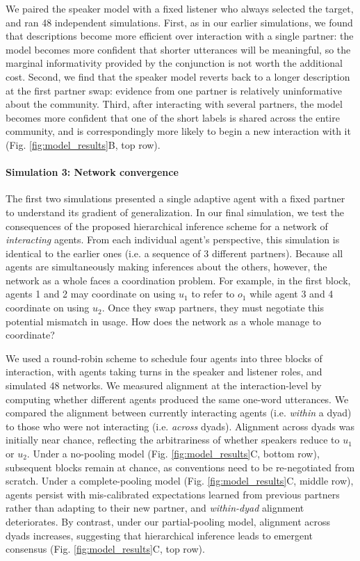 We paired the speaker model with a fixed listener who always selected the target, and ran 48 independent simulations.
First, as in our earlier simulations, we found that descriptions become more efficient over interaction with a single partner: the model becomes more confident that shorter utterances will be meaningful, so the marginal informativity provided by the conjunction is not worth the additional cost.
Second, we find that the speaker model reverts back to a longer description at the first partner swap: evidence from one partner is relatively uninformative about the community.
Third, after interacting with several partners, the model becomes more confident that one of the short labels is shared across the entire community, and is correspondingly more likely to begin a new interaction with it (Fig. \ref{fig:model_results}B, top row).

\paragraph{Simulation 3: Network convergence}

The first two simulations presented a single adaptive agent with a fixed partner to understand its gradient of generalization. 
In our final simulation, we test the consequences of the proposed hierarchical inference scheme for a network of \emph{interacting} agents.
From each individual agent's perspective, this simulation is identical to the earlier ones (i.e. a sequence of 3 different partners).
Because all agents are simultaneously making inferences about the others, however, the network as a whole faces a coordination problem.
For example, in the first block, agents 1 and 2 may coordinate on using $u_1$ to refer to $o_1$ while agent 3 and 4 coordinate on using $u_2$. 
Once they swap partners, they must negotiate this potential mismatch in usage. 
How does the network as a whole manage to coordinate?

We used a round-robin scheme to schedule four agents into three blocks of interaction, with agents taking turns in the speaker and listener roles, and simulated 48 networks.
We measured alignment at the interaction-level by computing whether different agents produced the same one-word utterances. 
We compared the alignment between currently interacting agents (i.e. \emph{within} a dyad) to those who were not interacting (i.e. \emph{across} dyads).
Alignment across dyads was initially near chance, reflecting the arbitrariness of whether speakers reduce to $u_1$ or $u_2$. 
Under a no-pooling model (Fig. \ref{fig:model_results}C, bottom row), subsequent blocks remain at chance, as conventions need to be re-negotiated from scratch.
Under a complete-pooling model (Fig. \ref{fig:model_results}C, middle row), agents persist with mis-calibrated expectations learned from previous partners rather than adapting to their new partner, and \emph{within-dyad} alignment deteriorates.
By contrast, under our partial-pooling model, alignment across dyads increases, suggesting that hierarchical inference leads to emergent consensus (Fig. \ref{fig:model_results}C, top row).

